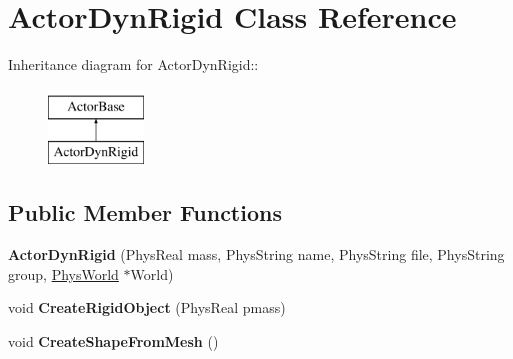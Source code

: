 \hypertarget{classActorDynRigid}{
\section{ActorDynRigid Class Reference}
\label{d4/d0e/classActorDynRigid}
}
Inheritance diagram for ActorDynRigid::\begin{figure}[H]
\begin{center}
\leavevmode
\includegraphics[height=2cm]{d4/d0e/classActorDynRigid}
\end{center}
\end{figure}
\subsection*{Public Member Functions}
\begin{DoxyCompactItemize}
\item 
\hypertarget{classActorDynRigid_a1402924eddf33a4789e3c3f68bbf6c98}{
{\bfseries ActorDynRigid} (PhysReal mass, PhysString name, PhysString file, PhysString group, \hyperlink{classPhysWorld}{PhysWorld} $\ast$World)}
\label{d4/d0e/classActorDynRigid_a1402924eddf33a4789e3c3f68bbf6c98}

\item 
\hypertarget{classActorDynRigid_a93052967ae8e6bebb810a5303ebc2a48}{
void {\bfseries CreateRigidObject} (PhysReal pmass)}
\label{d4/d0e/classActorDynRigid_a93052967ae8e6bebb810a5303ebc2a48}

\item 
\hypertarget{classActorDynRigid_adbfe8a19f8aafe7928d9896c37821059}{
void {\bfseries CreateShapeFromMesh} ()}
\label{d4/d0e/classActorDynRigid_adbfe8a19f8aafe7928d9896c37821059}

\end{DoxyCompactItemize}
